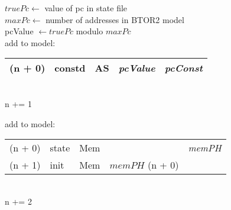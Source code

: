 \begin{algorithm}
    $truePc \leftarrow$ value of pc in state file\\
    $maxPc \leftarrow$ number of addresses in BTOR2 model\\
    \textcolor{UniBlue}{pcValue} $\leftarrow truePc$ modulo $maxPc$\\
    add to model:\\
    \begin{tabular}[h]{>{\color{UniRed}}r l >{\color{UniGrey}}l l >{\slshape} l}
        \hline
        \hline
        \ttfamily
        (n + 0) & constd & AS & \textcolor{UniBlue}{\rmfamily\textsl{pcValue}} & pcConst \\
        \hline
        \hline
    \end{tabular}\\
    \textcolor{UniRed}{n} += 1
    \BlankLine

    \BlankLine
    add to model:\\

    \begin{tabular}[h]{>{\ttfamily\color{UniRed}}r >{\ttfamily}l >{\ttfamily\color{UniGrey}}l >{\ttfamily}l >{\slshape} l}
        \hline
        \hline
        (n + 0) & state & Mem &                                     & memPH \\
        (n + 1) & init  & Mem & \textcolor{UniRed}{$memPH$ (n + 0)} &       \\
        \hline
        \hline
    \end{tabular}\\
    \textcolor{UniRed}{n} += 2\\


\end{algorithm}
